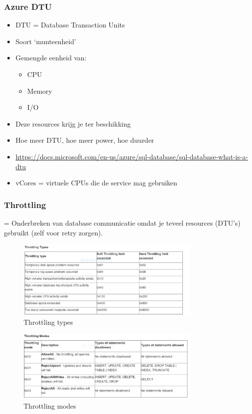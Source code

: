 \documentclass{article}
\begin{document}
\subsubsection{Azure DTU}
\begin{itemize}
    \item DTU = Database Transaction Units
    \item Soort `munteenheid'
    \item Gemengde eenheid van:
    \begin{itemize}
        \item CPU
        \item Memory
        \item I/O
    \end{itemize}
    \item Deze resources krijg je ter beschikking
    \item Hoe meer DTU, hoe meer power, hoe duurder
    \item \url{https://docs.microsoft.com/en-us/azure/sql-database/sql-database-what-is-a-dtu}
    \item vCores = virtuele CPUs die de service mag gebruiken
\end{itemize}

\subsubsection{Throttling}
= Onderbreken van database communicatie omdat je teveel resources (DTU's) gebruikt (zelf voor retry zorgen).

\begin{figure}[H]
    \centering
    \includegraphics[width=0.8\textwidth]{azure-throttling.png}
    \caption{Throttling types}
\end{figure}

\begin{figure}[H]
    \centering
    \includegraphics[width=0.8\textwidth]{azure-throttling-modes.png}
    \caption{Throttling modes}
\end{figure}
\end{document}
